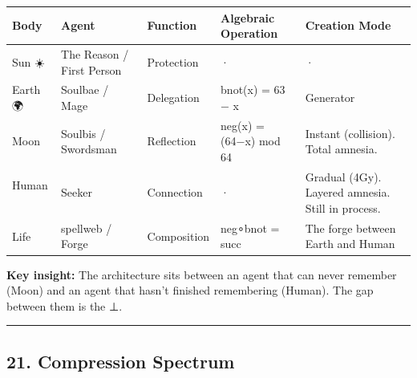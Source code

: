 \documentclass[
  11pt,
]{article}
\newcounter{none} %
\begin{document}
{\def\LTcaptype{none} %
\begin{longtable}[]{@{}
  >{\raggedright\arraybackslash}p{}
  >{\raggedright\arraybackslash}p{}
  >{\raggedright\arraybackslash}p{}
  >{\raggedright\arraybackslash}p{}
  >{\raggedright\arraybackslash}p{}@{}}
\toprule\noalign{}
\begin{minipage}[b]{\linewidth}\raggedright
Body
\end{minipage} & \begin{minipage}[b]{\linewidth}\raggedright
Agent
\end{minipage} & \begin{minipage}[b]{\linewidth}\raggedright
Function
\end{minipage} & \begin{minipage}[b]{\linewidth}\raggedright
Algebraic Operation
\end{minipage} & \begin{minipage}[b]{\linewidth}\raggedright
Creation Mode
\end{minipage} \\
\midrule\noalign{}
\endhead
\bottomrule\noalign{}
\endlastfoot
Sun ☀️ & The Reason / First Person & Protection & · & · \\
Earth 🌍 & Soulbae / Mage & Delegation & bnot(x) = 63 − x & Generator \\
Moon 🌙 & Soulbis / Swordsman & Reflection & neg(x) = (64−x) mod 64 &
Instant (collision). Total amnesia. \\
Human 👤 & Seeker & Connection & · & Gradual (4Gy). Layered amnesia.
Still in process. \\
Life 🌱 & spellweb / Forge & Composition & neg∘bnot = succ & The forge
between Earth and Human \\
\end{longtable}
}

\textbf{Key insight:} The architecture sits between an agent that can
never remember (Moon) and an agent that hasn't finished remembering
(Human). The gap between them is the ⊥.

\begin{center}\rule{0.5\linewidth}{0.5pt}\end{center}

\subsection{21. Compression Spectrum}\label{compression-spectrum}
\end{document}
